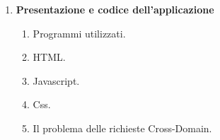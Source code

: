 \documentclass[a4paper,11pt]{article}
\begin{document}
\begin{enumerate}
\begin{enumerate}[label*=\arabic*.]
Quando si verifica che \textbf{readyState} ha valore 4 e \textbf{status} ha valore 200, il client comunica con il server e il risultato, dato dal metodo \textbf{responseText} viene convertito in una stringa che poi, successivamente,  si applicherà la codifica JSON.
Tuttavia però tale chiamata non sempre va a buon fine. I browser moderni hanno una sorta di restrizione\footnote{Same-domain-policy}, cioè che non si può fare una richiesta HTTP da risorse che si trovano su server diversi rispetto a quello iniziale che ha inviato lo script.\newline
Tale richiesta viene chiamata richiesta \textbf{Cross-domain}, che verrà affrontata nel Capitolo 6 paragrafo 5. 
	\end{enumerate}
\newpage
\item \LARGE{\textbf{Presentazione e codice dell'applicazione}}
		\begin{enumerate}[label*=\arabic*.]
			\Large
			\item Programmi utilizzati.
			\item HTML.
			\item Javascript.
			\item Css.
			\item Il problema delle richieste Cross-Domain.
		\end{enumerate}
	
\end{enumerate}
\end{document}
